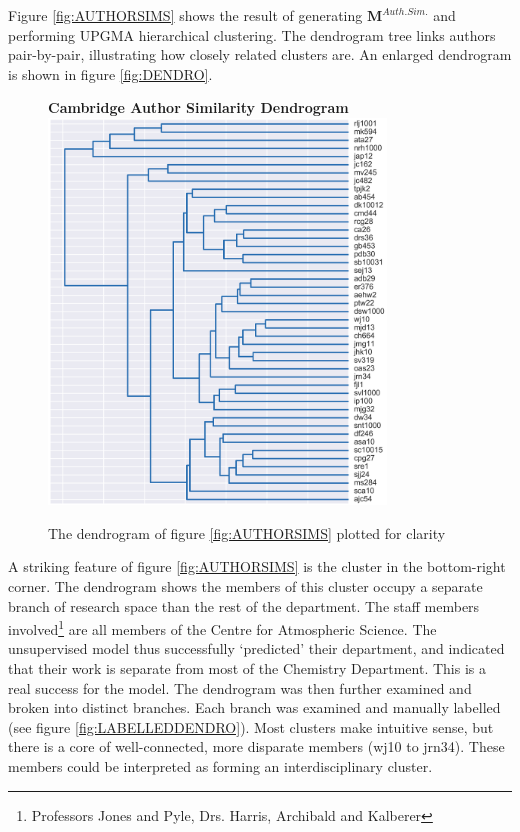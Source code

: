Figure \ref{fig:AUTHORSIMS} shows the result of generating $\textbf{M}^{Auth. Sim.}$ and performing UPGMA hierarchical clustering. The dendrogram tree links authors pair-by-pair, illustrating how closely related clusters are. An enlarged dendrogram is shown in figure \ref{fig:DENDRO}.
\newpage
\begin{center}
\begin{figure}[H]
  \centering
  \textbf{Cambridge Author Similarity Dendrogram}
    \includegraphics[width=0.8\textwidth]{Analysis/dendro.png}
    \caption[Cambridge Author Similarity Dendrogram]{The dendrogram of figure \ref{fig:AUTHORSIMS} plotted for clarity}
\end{figure} 
\label{fig:DENDRO}
\end{center}
\newpage
A striking feature of figure \ref{fig:AUTHORSIMS} is the cluster in the bottom-right corner. The dendrogram shows the members of this cluster occupy a separate branch of research space than the rest of the department. The staff members involved\footnote{Professors Jones and Pyle, Drs. Harris, Archibald and Kalberer} are all members of the Centre for Atmospheric Science. The unsupervised model thus successfully `predicted' their department, and indicated that their work is separate from most of the Chemistry Department. This is a real success for the model. The dendrogram was then further examined and broken into distinct branches. Each branch was examined and manually labelled (see figure \ref{fig:LABELLEDDENDRO}). Most clusters make intuitive sense, but there is a core of well-connected, more disparate members (wj10 to jrn34). These members could be interpreted as forming an interdisciplinary cluster.  
